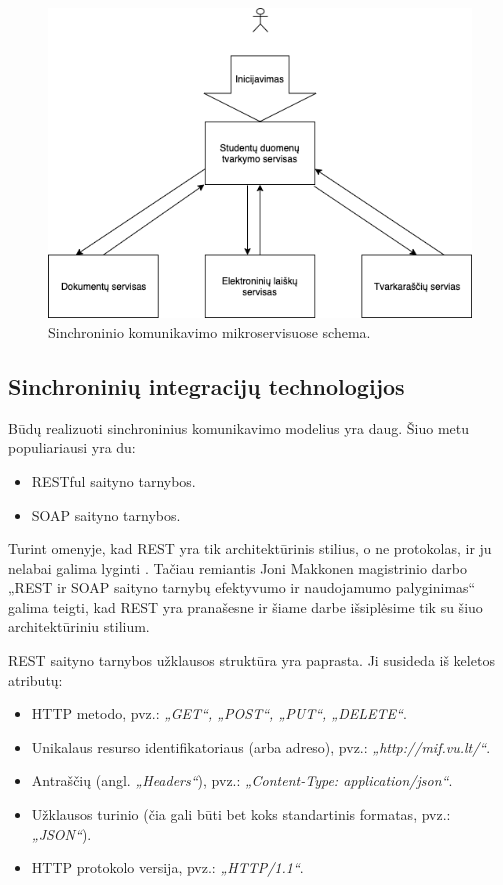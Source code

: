 \begin{figure}[H]
  \centering
  \includegraphics[scale=0.6]{img/synchronous-microservices-scheme}
  \caption{Sinchroninio komunikavimo mikroservisuose schema.}
  \label{img:synchronous-microservices-scheme}
\end{figure}

\subsection{Sinchroninių integracijų technologijos}
Būdų realizuoti sinchroninius komunikavimo modelius yra daug. Šiuo metu populiariausi yra du:
\begin{itemize}
	\item RESTful saityno tarnybos.
	\item SOAP saityno tarnybos.
\end{itemize}
\break

Turint omenyje, kad REST yra tik architektūrinis stilius, o ne protokolas, ir ju nelabai galima lyginti \cite{Misc5}. Tačiau
remiantis Joni Makkonen magistrinio darbo „REST ir SOAP saityno tarnybų efektyvumo ir naudojamumo palyginimas“ \cite{MstrThs2} galima teigti, kad
REST yra pranašesne ir šiame darbe išsiplėsime tik su šiuo architektūriniu stilium.
\break

REST saityno tarnybos užklausos struktūra yra paprasta. Ji susideda iš keletos atributų:
\begin{itemize}
	\item HTTP metodo, pvz.: \textit{„GET“, „POST“, „PUT“, „DELETE“}.
	\item Unikalaus resurso identifikatoriaus (arba adreso), pvz.: \textit{„http://mif.vu.lt/“}.
	\item Antraščių (angl. \textit{„Headers“}), pvz.: \textit{„Content-Type: application/json“}.
	\item Užklausos turinio (čia gali būti bet koks standartinis formatas, pvz.: \textit{„JSON“}).
	\item HTTP protokolo versija, pvz.: \textit{„HTTP/1.1“}.
\end{itemize}

